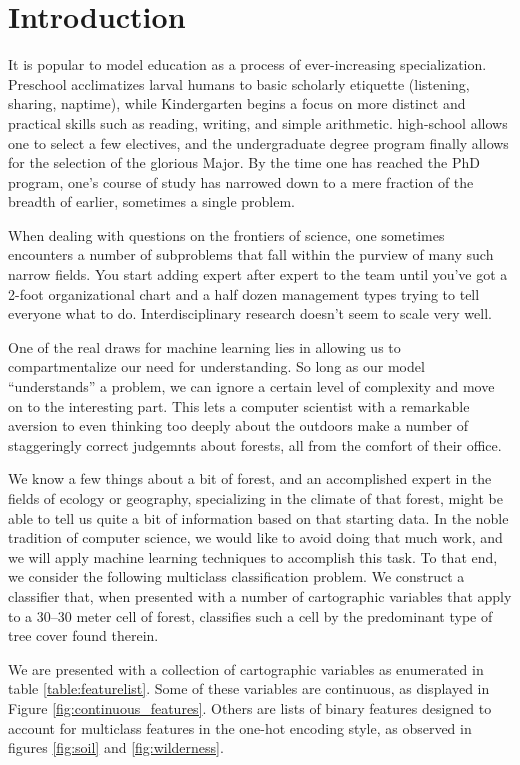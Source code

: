 \section{Introduction}
\label{sec:-intro}

It is popular to model education as a process of ever-increasing 
specialization.  Preschool acclimatizes larval humans to basic 
scholarly etiquette (listening, sharing, naptime), while Kindergarten 
begins a focus on more distinct and practical skills such as reading, 
writing, and simple arithmetic.  high-school allows one to select a few 
electives, and the undergraduate degree program finally allows for the 
selection of the glorious Major.  By the time one has reached the PhD 
program, one's course of study has narrowed down to a mere fraction of 
the breadth of earlier, sometimes a single problem.

When dealing with questions on the frontiers of science, one sometimes 
encounters a number of subproblems that fall within the purview of many 
such narrow fields.  You start adding expert after expert to the team 
until you've got a 2-foot organizational chart and a half dozen 
management types trying to tell everyone what to do.  Interdisciplinary 
research doesn't seem to scale very well.

One of the real draws for machine learning lies in allowing us to 
compartmentalize our need for understanding.  So long as our model 
``understands'' a problem, we can ignore a certain level of complexity 
and move on to the interesting part.  This lets a computer scientist 
with a remarkable aversion to even thinking too deeply about the 
outdoors make a number of staggeringly correct judgemnts about forests, 
all from the comfort of their office.

We know a few things about a bit of forest, and an accomplished expert 
in the fields of ecology or geography, specializing in the climate of 
that forest, might be able to tell us quite a bit of information based 
on that starting data.  In the noble tradition of computer science, we 
would like to avoid doing that much work, and we will apply machine 
learning techniques to accomplish this task.  To that end, we consider 
the following multiclass classification problem. We construct a 
classifier that, when presented with a number of cartographic variables 
that apply to a 30--30 meter cell of forest, classifies such a cell by 
the predominant type of tree cover found therein.

We are presented with a collection of cartographic variables as 
enumerated in table \ref{table:featurelist}.  Some of 
these variables are continuous, as displayed in Figure 
\ref{fig:continuous_features}.  Others are lists of binary features 
designed to account for multiclass features in the one-hot encoding 
style, as observed in figures \ref{fig:soil} and \ref{fig:wilderness}.


